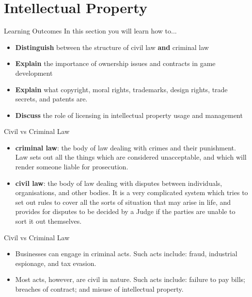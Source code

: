 \part{Intellectual Property}
\frame{\partpage}

\begin{frame}{Learning Outcomes}
	In this section you will learn how to...
	
	\begin{itemize}
		\item \textbf{Distinguish} between the structure of civil law \textbf{and} criminal law
		\item \textbf{Explain} the importance of ownership issues and contracts in game development
		\item \textbf{Explain} what copyright, moral rights, trademarks, design rights, trade secrets, and patents are.
		\item \textbf{Discuss} the role of licensing in intellectual property usage and management
	\end{itemize}
\end{frame}

\begin{frame}{Civil vs Criminal Law}
	\begin{itemize}
		\item \textbf{criminal law}: the body of law dealing with crimes and their punishment. Law sets out all the things which are considered 
		unacceptable, and which will render someone liable for prosecution.
		\vspace{2ex}
		\item \textbf{civil law}: the body of law dealing with disputes between individuals, organisations, and other bodies. It is a very 
		complicated system which tries to set out rules to cover all the sorts of situation that may arise in life, and provides for disputes 
		to be decided by a Judge if the parties are unable to sort it out themselves.
	\end{itemize}
\end{frame}

\begin{frame}{Civil vs Criminal Law}
	\begin{itemize}
		\item Businesses can engage in criminal acts. Such acts include: fraud, industrial espionage, and tax evasion.
		\vspace{2ex}
		\item Most acts, however, are civil in nature. Such acts include: failure to pay bills; breaches of contract; and misuse of intellectual property.
	\end{itemize}
\end{frame}

